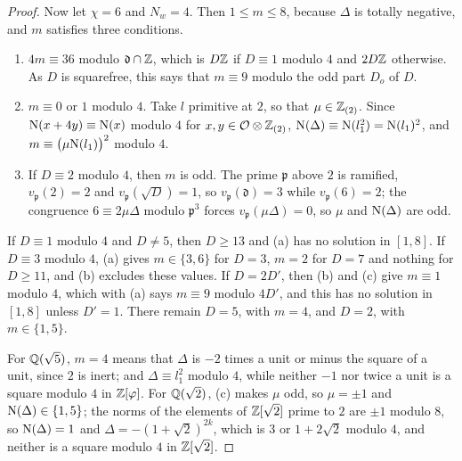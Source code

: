 \begin{proof}
Now let $\chi=6$ and $N_{w}=4$. Then $1\le m\le8$, because $\Delta$ is
totally negative, and $m$ satisfies three conditions.
\begin{enumerate}[label=\textup{(\alph*)},leftmargin=2.6em,itemsep=2pt]
\item $4m\equiv36$ modulo $\mathfrak d\cap\mathbb{Z}$, which is $D\mathbb{Z}$ if
  $D\equiv1$ modulo $4$ and $2D\mathbb{Z}$ otherwise. As $D$ is squarefree, this
  says that $m\equiv9$ modulo the odd part $D_{o}$ of $D$.
\item $m\equiv0$ or $1$ modulo $4$. Take $l$ primitive at $2$, so that
  $\mu\in\mathbb{Z}_{(2)}$. Since $\mathrm{N}(x+4y)\equiv\mathrm{N}(x)$ modulo $4$ for
  $x,y\in\mathcal{O}\otimes\mathbb{Z}_{(2)}$, $\mathrm{N}(\Delta)\equiv\mathrm{N}(l_{1}^{2})=\mathrm{N}(l_{1})^{2}$,
  and $m\equiv\bigl(\mu\mathrm{N}(l_{1})\bigr)^{2}$ modulo $4$.
\item If $D\equiv2$ modulo $4$, then $m$ is odd. The prime $\mathfrak p$ above
  $2$ is ramified, $v_{\mathfrak p}(2)=2$ and $v_{\mathfrak p}(\sqrt D)=1$, so
  $v_{\mathfrak p}(\mathfrak d)=3$ while $v_{\mathfrak p}(6)=2$; the congruence
  $6\equiv2\mu\Delta$ modulo $\mathfrak p^{3}$ forces
  $v_{\mathfrak p}(\mu\Delta)=0$, so $\mu$ and $\mathrm{N}(\Delta)$ are odd.
\end{enumerate}
If $D\equiv1$ modulo $4$ and $D\ne5$, then $D\ge13$ and (a) has no solution
in $[1,8]$. If $D\equiv3$ modulo $4$, (a) gives $m\in\{3,6\}$ for $D=3$,
$m=2$ for $D=7$ and nothing for $D\ge11$, and (b) excludes these values. If
$D=2D'$, then (b) and (c) give $m\equiv1$ modulo $4$, which with (a) says
$m\equiv9$ modulo $4D'$, and this has no solution in $[1,8]$ unless $D'=1$.
There remain $D=5$, with $m=4$, and $D=2$, with $m\in\{1,5\}$.

For $\mathbb{Q}(\sqrt5)$, $m=4$ means that $\Delta$ is $-2$ times a unit or minus the
square of a unit, since $2$ is inert; and $\Delta\equiv l_{1}^{2}$ modulo $4$,
while neither $-1$ nor twice a unit is a square modulo $4$ in $\mathbb{Z}[\varphi]$.
For $\mathbb{Q}(\sqrt2)$, (c) makes $\mu$ odd, so $\mu=\pm1$ and
$\mathrm{N}(\Delta)\in\{1,5\}$; the norms of the elements of $\mathbb{Z}[\sqrt2]$ prime to
$2$ are $\pm1$ modulo $8$, so $\mathrm{N}(\Delta)=1$ and $\Delta=-(1+\sqrt2)^{2k}$,
which is $3$ or $1+2\sqrt2$ modulo $4$, and neither is a square modulo $4$ in
$\mathbb{Z}[\sqrt2]$.
\end{proof}

